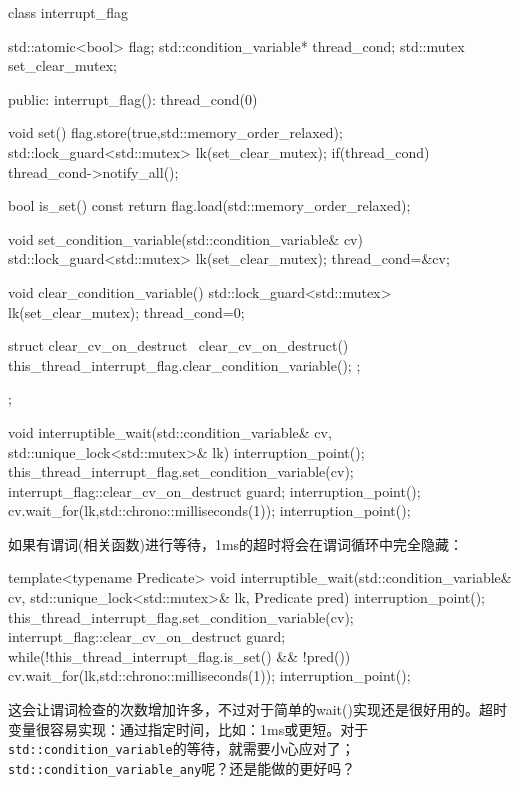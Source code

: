 \begin{cpp}
class interrupt_flag
{
  std::atomic<bool> flag;
  std::condition_variable* thread_cond;
  std::mutex set_clear_mutex;

public:
  interrupt_flag():
    thread_cond(0)
  {}

  void set()
  {
    flag.store(true,std::memory_order_relaxed);
    std::lock_guard<std::mutex> lk(set_clear_mutex);
    if(thread_cond)
    {
      thread_cond->notify_all();
    }
  }

  bool is_set() const
  {
    return flag.load(std::memory_order_relaxed);
  }

  void set_condition_variable(std::condition_variable& cv)
  {
    std::lock_guard<std::mutex> lk(set_clear_mutex);
    thread_cond=&cv;
  }

  void clear_condition_variable()
  {
    std::lock_guard<std::mutex> lk(set_clear_mutex);
    thread_cond=0;
  }

  struct clear_cv_on_destruct
  {
    ~clear_cv_on_destruct()
    {
      this_thread_interrupt_flag.clear_condition_variable();
    }
  };
};

void interruptible_wait(std::condition_variable& cv,
  std::unique_lock<std::mutex>& lk)
{
  interruption_point();
  this_thread_interrupt_flag.set_condition_variable(cv);
  interrupt_flag::clear_cv_on_destruct guard;
  interruption_point();
  cv.wait_for(lk,std::chrono::milliseconds(1));
  interruption_point();
}
\end{cpp}

如果有谓词(相关函数)进行等待，1ms的超时将会在谓词循环中完全隐藏：

\begin{cpp}
template<typename Predicate>
void interruptible_wait(std::condition_variable& cv,
                        std::unique_lock<std::mutex>& lk,
                        Predicate pred)
{
  interruption_point();
  this_thread_interrupt_flag.set_condition_variable(cv);
  interrupt_flag::clear_cv_on_destruct guard;
  while(!this_thread_interrupt_flag.is_set() && !pred())
  {
    cv.wait_for(lk,std::chrono::milliseconds(1));
  }
  interruption_point();
}
\end{cpp}

这会让谓词检查的次数增加许多，不过对于简单的wait()实现还是很好用的。超时变量很容易实现：通过指定时间，比如：1ms或更短。对于\texttt{std::condition\_variable}的等待，就需要小心应对了；\texttt{std::condition\_variable\_any}呢？还是能做的更好吗？


